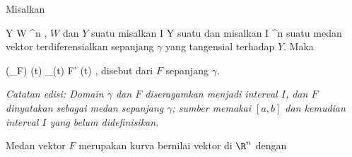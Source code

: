 {}
{

Misalkan

\mavergleichskette
{\vergleichskette
{ Y
}
{ \subseteq }{ W
}
{ \subseteq }{\R^n
}
{    }{
}
{   }{
}
}
{}{}{,} $W$
dan $Y$ suatu
misalkan
\maabbdisp {\gamma} {I} {Y
} {}
suatu
dan misalkan
 { I } { \R^n
} {}
suatu medan vektor terdiferensialkan sepanjang $\gamma$ yang tangensial terhadap $Y$. Maka

\mavergleichskettedisp
{\vergleichskette
{ (\nabla_\gamma F) (t)
}
{ } { \pi_{\gamma(t)} F' (t)
}
{ } {
}
{ } {
}
{ } {
}
}
{}{}{,}
disebut
dari $F$ sepanjang $\gamma$.

\emph{Catatan edisi: Domain $\gamma$ dan $F$ diseragamkan menjadi interval $I$, dan $F$ dinyatakan sebagai medan sepanjang $\gamma$; sumber memakai $[a,b]$ dan kemudian interval $I$ yang belum didefinisikan.}

}

Medan vektor $F$ merupakan kurva bernilai vektor di $\R^n$ dengan

